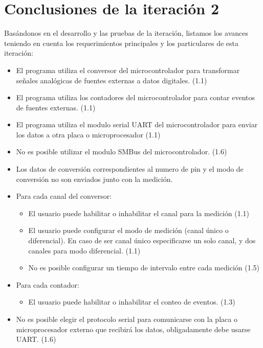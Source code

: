 \section{Conclusiones de la iteración 2} %
\label{it2:sec:conclusiones_de_la_iteracion_2}

Basándonos en el desarrollo y las pruebas de la iteración, listamos los avances teniendo en cuenta los requerimientos principales y los particulares de esta iteración:

\begin{itemize}
\item El programa utiliza el conversor del microcontrolador para transformar señales analógicas de fuentes externas a datos digitales. (1.1)
\item El programa utiliza los contadores del microcontrolador para contar eventos de fuentes externas. (1.1)
\item El programa utiliza el modulo serial UART del microcontrolador para enviar los datos a otra placa o microprocesador (1.1)
\item No es posible utilizar el modulo SMBus del microcontrolador. (1.6)
\item Los datos de conversión correspondientes al numero de pin y el modo de conversión no son enviados junto con la medición. 
\item Para cada canal del conversor:
\begin{itemize}
\item El usuario puede habilitar o inhabilitar el canal para la medición (1.1)
\item El usuario puede configurar el modo de medición (canal único o diferencial). En caso de ser canal único especificarse un solo canal, y dos canales para modo diferencial. (1.1)
\item No es posible configurar un tiempo de intervalo entre cada medición (1.5)
\end{itemize}
\item Para cada contador:
\begin{itemize}
\item El usuario puede habilitar o inhabilitar el conteo de eventos. (1.3)
\end{itemize}
\item No es posible elegir el protocolo serial para comunicarse con la placa o microprocesador externo que recibirá los datos, obligadamente debe usarse UART. (1.6)

\end{itemize}

